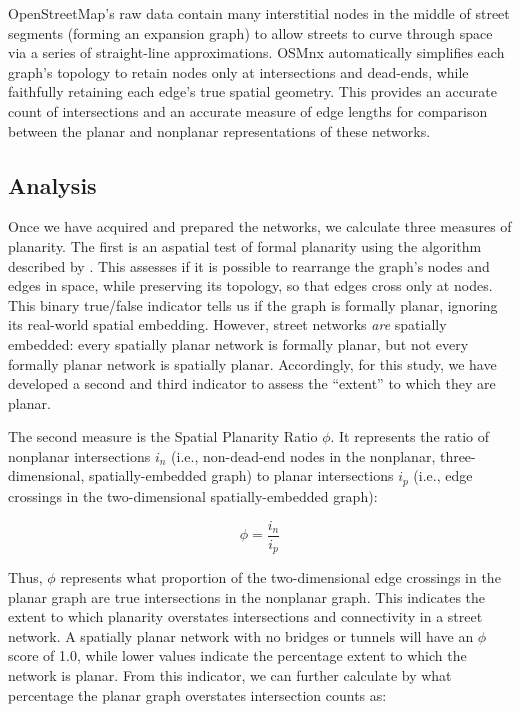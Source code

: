 \documentclass[Afour,sageh,times]{sagej}
\begin{document}
OpenStreetMap's raw data contain many interstitial nodes in the middle of street segments (forming an expansion graph) to allow streets to curve through space via a series of straight-line approximations. OSMnx automatically simplifies each graph's topology to retain nodes only at intersections and dead-ends, while faithfully retaining each edge's true spatial geometry. This provides an accurate count of intersections and an accurate measure of edge lengths for comparison between the planar and nonplanar representations of these networks.

\subsection{Analysis}

Once we have acquired and prepared the networks, we calculate three measures of planarity. The first is an aspatial test of formal planarity using the algorithm described by \citet{boyer_subgraph_2012}. This assesses if it is possible to rearrange the graph's nodes and edges in space, while preserving its topology, so that edges cross only at nodes. This binary true/false indicator tells us if the graph is formally planar, ignoring its real-world spatial embedding. However, street networks \emph{are} spatially embedded: every spatially planar network is formally planar, but not every formally planar network is spatially planar. Accordingly, for this study, we have developed a second and third indicator to assess the \enquote{extent} to which they are planar.

The second measure is the Spatial Planarity Ratio $\phi$. It represents the ratio of nonplanar intersections $i_n$ (i.e., non-dead-end nodes in the nonplanar, three-dimensional, spatially-embedded graph) to planar intersections $i_p$ (i.e., edge crossings in the two-dimensional spatially-embedded graph): 

\begin{equation}
	\label{eq:spr}
	\phi = \frac{i_n}{i_p}
\end{equation}

Thus, $\phi$ represents what proportion of the two-dimensional edge crossings in the planar graph are true intersections in the nonplanar graph. This indicates the extent to which planarity overstates intersections and connectivity in a street network. A spatially planar network with no bridges or tunnels will have an $\phi$ score of 1.0, while lower values indicate the percentage extent to which the network is planar. From this indicator, we can further calculate by what percentage the planar graph overstates intersection counts as:
\end{document}

